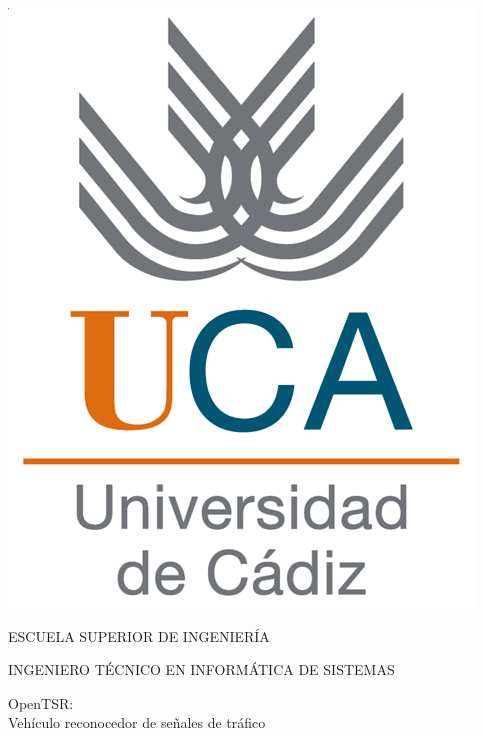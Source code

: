 


\pagestyle{empty}
\begin{center}

  \includegraphics[scale=0.2]{logo_uca.png} \\

  \vspace{2.0cm}

  \Large{ESCUELA SUPERIOR DE INGENIERÍA} \\

  \vspace{1.0cm}

  \large{INGENIERO TÉCNICO EN INFORMÁTICA DE SISTEMAS} \\

  \vspace{2.0cm}

  \large{OpenTSR: \\Vehículo reconocedor de señales de tráfico} \\

  \vspace{1.0cm}

\end{center}


